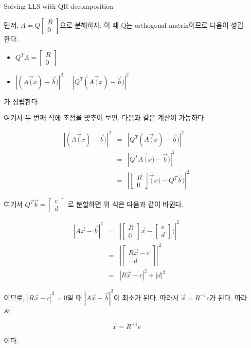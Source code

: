 \documentclass{beamer}
\begin{document}
\begin{frame}[allowframebreaks]{Solving LLS with QR decomposition} 

먼저, $A = Q\left[ \begin{matrix} R\\ 0 \end{matrix} \right]$으로 분해하자. 이 때 Q는 orthogonal matrix이므로 다음이 성립한다. 

\begin{itemize}
\item $Q^T A = \left[ \begin{matrix} R\\ 0 \end{matrix} \right]$ 
\item $|(A\vec(x) - \vec{b})|^2 = |Q^T (A\vec(x) - \vec{b})|^2 $
\end{itemize}

가 성립한다. 

여기서 두 번째 식에 초점을 맞추어 보면, 다음과 같은 계산이 가능하다. 

\begin{eqnarray} 
|(A\vec(x) - \vec{b})|^2 &=& |Q^T(A\vec(x) - \vec{b})|^2 \\
&=& |Q^TA \vec(x) - \vec{b})|^2 \\
&=& \left|\left[ \begin{matrix} R\\ 0 \end{matrix} \right] \vec(x) - Q^T\vec{b})\right|^2 
\end{eqnarray}

여기서 $Q^T \vec{b} = \left[ \begin{matrix} c\\ d \end{matrix} \right]$ 로 분할하면 위 식은 다음과 같이 바뀐다. 

\begin{eqnarray} 
|A\vec{x} - \vec{b}|^2 &=& \left|\left[ \begin{matrix} R\\ 0 \end{matrix} \right] \vec{x} - \left[ \begin{matrix} c\\ d \end{matrix} \right])\right|^2 \\ 
&=& \left|\left[ \begin{matrix} R\vec{x}-c\\ -d \end{matrix} \right]\right|^2 \\ 
&=& |R\vec{x}-c|^2 + |d|^2 
\end{eqnarray}

이므로, $|R\vec{x}-c|^2 = 0$일 때 $|A\vec{x}-\vec{b}|^2$이 최소가 된다. 따라서 $\vec{x} = R^{-1}c$가 된다. 따라서 

\begin{equation} 
\vec{x} = R^{-1}c 
\end{equation}

이다. 

\end{frame}
\end{document}
